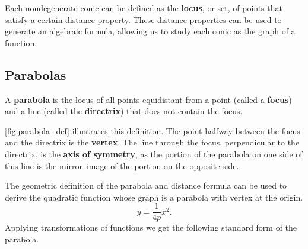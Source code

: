 Each nondegenerate conic can be defined as the \textbf{locus}, or set, of points that satisfy a certain distance property. These distance properties can be used to generate an algebraic formula, allowing us to study each conic as the graph of a function.

\subsection*{Parabolas}

{A \textbf{parabola} is the locus of all points equidistant from a point (called a \textbf{focus}) and a line (called the \textbf{directrix}) that does not contain the focus.
}

\autoref{fig:parabola_def} illustrates this definition. The point halfway between the focus and the directrix is the \textbf{vertex}. The line through the focus, perpendicular to the directrix, is the \textbf{axis of symmetry}, as the portion of the parabola on one side of this line is the mirror--image of the portion on the opposite side.

%
The geometric definition of the parabola and distance formula can be used to derive the quadratic function whose graph is a parabola with vertex at the origin.
\[y=\frac{1}{4p}x^2.\]
Applying transformations of functions we get the following standard form of the parabola.

